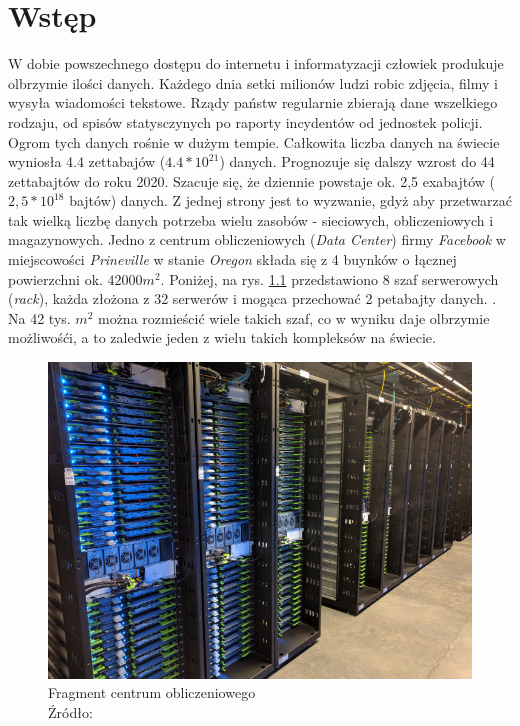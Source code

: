 \chapter{Wstęp}
W dobie powszechnego dostępu do internetu i informatyzacji człowiek produkuje olbrzymie ilości danych.
Każdego dnia setki milionów ludzi robic zdjęcia, filmy i wysyła wiadomości tekstowe.
Rządy państw regularnie zbierają dane wszelkiego rodzaju, od spisów statysczynych po raporty incydentów od jednostek policji.
Ogrom tych danych rośnie w dużym tempie.
Całkowita liczba danych na świecie wyniosła 4.4 zettabajów ($4.4 * 10^{21}$) danych.
Prognozuje się dalszy wzrost do 44 zettabajtów do roku 2020.
Szacuje się, że dziennie powstaje ok. 2,5 exabajtów ($2,5 * 10^{18}$ bajtów) danych. \cite{khoso2016}
Z jednej strony jest to wyzwanie, gdyż aby przetwarzać tak wielką liczbę danych potrzeba wielu zasobów - sieciowych, obliczeniowych i magazynowych.
Jedno z centrum obliczeniowych (\textit{Data Center}) firmy \textit{Facebook} w miejscowości \textit{Prineville} w stanie \textit{Oregon} składa się z 4 buynków o łącznej powierzchni ok. $42000 m^2$.
Poniżej, na rys. \ref{fig:data_center} przedstawiono 8 szaf serwerowych (\textit{rack}), każda złożona z 32 serwerów i mogąca przechować 2 petabajty danych. \cite{lardinois2016}.
Na 42 tys. $m^2$ można rozmieścić wiele takich szaf, co w wyniku daje olbrzymie możliwośći, a to zaledwie jeden z wielu takich kompleksów na świecie.

\begin{figure}[h!tb]
	 \centering
	 \includegraphics[width = 1.0\linewidth]{img/data_center}
	 \caption{Fragment centrum obliczeniowego \\
              Źródło: \cite{lardinois2016}}
	 \label{fig:data_center}
\end{figure}

